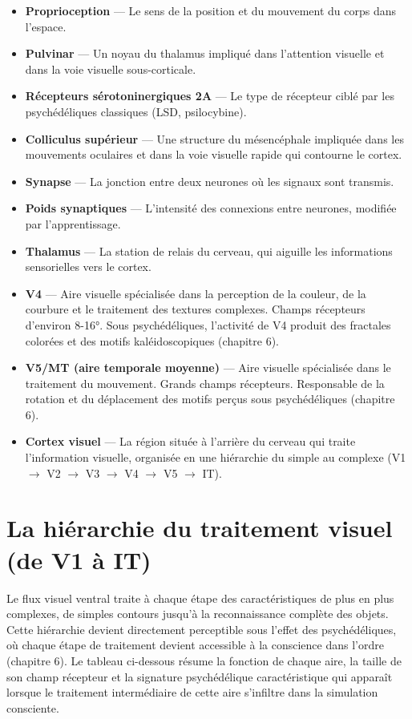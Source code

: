 \documentclass[11pt, twoside, openright]{book}
\begin{document}
\begin{itemize}
  \item \textbf{Proprioception} --- Le sens de la position et du mouvement du corps dans l'espace.
  \item \textbf{Pulvinar} --- Un noyau du thalamus impliqué dans l'attention visuelle et dans la voie visuelle sous-corticale.
  \item \textbf{Récepteurs sérotoninergiques 2A} --- Le type de récepteur ciblé par les psychédéliques classiques (LSD, psilocybine).
  \item \textbf{Colliculus supérieur} --- Une structure du mésencéphale impliquée dans les mouvements oculaires et dans la voie visuelle rapide qui contourne le cortex.
  \item \textbf{Synapse} --- La jonction entre deux neurones où les signaux sont transmis.
  \item \textbf{Poids synaptiques} --- L'intensité des connexions entre neurones, modifiée par l'apprentissage.
  \item \textbf{Thalamus} --- La station de relais du cerveau, qui aiguille les informations sensorielles vers le cortex.
  \item \textbf{V4} --- Aire visuelle spécialisée dans la perception de la couleur, de la courbure et le traitement des textures complexes. Champs récepteurs d'environ 8-16°. Sous psychédéliques, l'activité de V4 produit des fractales colorées et des motifs kaléidoscopiques (chapitre 6).
  \item \textbf{V5/\allowbreak{}MT (aire temporale moyenne)} --- Aire visuelle spécialisée dans le traitement du mouvement. Grands champs récepteurs. Responsable de la rotation et du déplacement des motifs perçus sous psychédéliques (chapitre 6).
  \item \textbf{Cortex visuel} --- La région située à l'arrière du cerveau qui traite l'information visuelle, organisée en une hiérarchie du simple au complexe (V1 $\rightarrow$ V2 $\rightarrow$ V3 $\rightarrow$ V4 $\rightarrow$ V5 $\rightarrow$ IT).
\end{itemize}

\section*{La hiérarchie du traitement visuel (de V1 à IT)}

Le flux visuel ventral traite à chaque étape des caractéristiques de plus en plus complexes, de simples contours jusqu'à la reconnaissance complète des objets. Cette hiérarchie devient directement perceptible sous l'effet des psychédéliques, où chaque étape de traitement devient accessible à la conscience dans l'ordre (chapitre 6). Le tableau ci-dessous résume la fonction de chaque aire, la taille de son champ récepteur et la signature psychédélique caractéristique qui apparaît lorsque le traitement intermédiaire de cette aire s'infiltre dans la simulation consciente.
\end{document}
